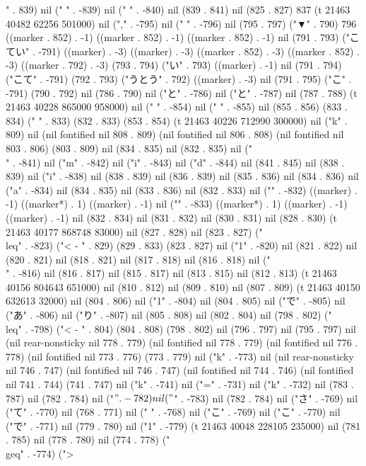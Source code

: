 " . 839) nil ("
" . -839) nil (" " . -840) nil (839 . 841) nil (825 . 827) 837 (t 21463 40482 62256 501000) nil ("," . -795) nil (" " . -796) nil (795 . 797) ("▼" . 790) 796 ((marker . 852) . -1) ((marker . 852) . -1) ((marker . 852) . -1) nil (791 . 793) ("こてい" . -791) ((marker) . -3) ((marker) . -3) ((marker . 852) . -3) ((marker . 852) . -3) ((marker . 792) . -3) (793 . 794) ("い" . 793) ((marker) . -1) nil (791 . 794) ("こて" . -791) (792 . 793) ("うとう" . 792) ((marker) . -3) nil (791 . 795) ("こ" . -791) (790 . 792) nil (786 . 790) nil ("と" . -786) nil ("と" . -787) nil (787 . 788) (t 21463 40228 865000 958000) nil ("
" . -854) nil (" " . -855) nil (855 . 856) (833 . 834) (" " . 833) (832 . 833) (853 . 854) (t 21463 40226 712990 300000) nil ("k" . 809) nil (nil fontified nil 808 . 809) (nil fontified nil 806 . 808) (nil fontified nil 803 . 806) (803 . 809) nil (834 . 835) nil (832 . 835) nil ("\\" . -841) nil ("m" . -842) nil ("i" . -843) nil ("d" . -844) nil (841 . 845) nil (838 . 839) nil ("i" . -838) nil (838 . 839) nil (836 . 839) nil (835 . 836) nil (834 . 836) nil ("a" . -834) nil (834 . 835) nil (833 . 836) nil (832 . 833) nil ("{" . -832) ((marker) . -1) ((marker*) . 1) ((marker) . -1) nil ("}" . -833) ((marker*) . 1) ((marker) . -1) ((marker) . -1) nil (832 . 834) nil (831 . 832) nil (830 . 831) nil (828 . 830) (t 21463 40177 868748 83000) nil (827 . 828) nil (823 . 827) ("\\leq" . -823) ("<
-
" . 829) (829 . 833) (823 . 827) nil ("1" . -820) nil (821 . 822) nil (820 . 821) nil (818 . 821) nil (817 . 818) nil (816 . 818) nil ("\\" . -816) nil (816 . 817) nil (815 . 817) nil (813 . 815) nil (812 . 813) (t 21463 40156 804643 651000) nil (810 . 812) nil (809 . 810) nil (807 . 809) (t 21463 40150 632613 32000) nil (804 . 806) nil ("1" . -804) nil (804 . 805) nil ("で" . -805) nil ("あ" . -806) nil ("り" . -807) nil (805 . 808) nil (802 . 804) nil (798 . 802) ("\\leq" . -798) ("<
-
" . 804) (804 . 808) (798 . 802) nil (796 . 797) nil (795 . 797) nil (nil rear-nonsticky nil 778 . 779) (nil fontified nil 778 . 779) (nil fontified nil 776 . 778) (nil fontified nil 773 . 776) (773 . 779) nil ("k" . -773) nil (nil rear-nonsticky nil 746 . 747) (nil fontified nil 746 . 747) (nil fontified nil 744 . 746) (nil fontified nil 741 . 744) (741 . 747) nil ("k" . -741) nil ("=" . -731) nil ("k" . -732) nil (783 . 787) nil (782 . 784) nil ("$" . -782) nil ("$" . -783) nil (782 . 784) nil ("さ" . -769) nil ("て" . -770) nil (768 . 771) nil (" " . -768) nil ("こ" . -769) nil ("こ" . -770) nil ("で" . -771) nil (779 . 780) nil ("1" . -779) (t 21463 40048 228105 235000) nil (781 . 785) nil (778 . 780) nil (774 . 778) ("\\geq" . -774) (">
